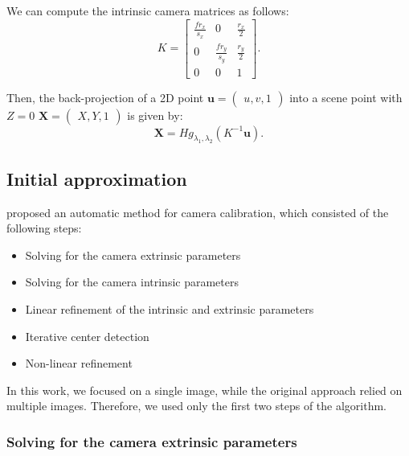 We can compute the intrinsic camera matrices as follows:
\begin{equation}
	K = \begin{bmatrix}
		\frac{f r_x}{s_x} & 0                 & \frac{r_x}{2} \\
		0                 & \frac{f r_y}{s_y} & \frac{r_y}{2} \\
		0                 & 0                 & 1
	\end{bmatrix}.
\end{equation}

Then, the back-projection of a 2D point \(\mathbf{u} = \begin{pmatrix}
	u, v, 1
\end{pmatrix}\) into a scene point with \(Z = 0\) \(\mathbf{X} = \begin{pmatrix}
	X, Y, 1
\end{pmatrix}\) is given by:
\begin{equation}
	\mathbf{X} = H g_{\lambda_1, \lambda_2}(K^{-1} \mathbf{u}).
\end{equation}

\subsection{Initial approximation}\label{sub:initial_approximation}

\cite{scaramuzzaToolboxEasilyCalibrating2006} proposed an automatic method for
camera calibration, which consisted of the following steps:
\begin{itemize}
	\item Solving for the camera extrinsic parameters
	\item Solving for the camera intrinsic parameters
	\item Linear refinement of the intrinsic and extrinsic parameters
	\item Iterative center detection
	\item Non-linear refinement
\end{itemize}

In this work, we focused on a single image, while the original approach relied
on multiple images. Therefore, we used only the first two steps of the
algorithm.

\subsubsection{Solving for the camera extrinsic parameters}\label{ssub:solving_for_the_camera_extrinsic_parameters}

